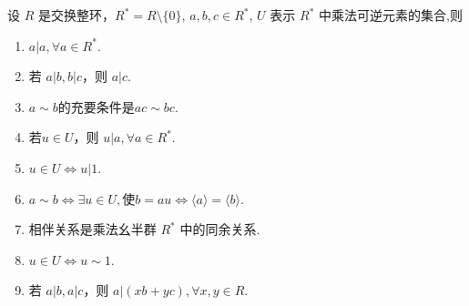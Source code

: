 \documentclass[../../main.tex]{subfiles}%
\begin{document}
\begin{theorem}\label{theorem:单位群整除的基本性质}
设 \( R \) 是交换整环，\( R^* = R \setminus \{0\} \), \( a, b,c \in R^* \), \( U \) 表示 \( R^* \) 中乘法可逆元素的集合,则
\begin{enumerate}[(1)]
\item\label{theorem:单位群整除的基本性质-1} \( a|a, \forall a \in R^* \).

\item 若 \( a|b, b|c \)，则 \( a|c \).

\item\label{theorem:单位群整除的基本性质-2} $a\sim b$的充要条件是$ac\sim bc.$

\item\label{theorem:单位群整除的基本性质-3} 若\( u \in U \)，则 \( u|a, \forall a \in R^* \). 

\item\label{theorem:单位群整除的基本性质-4} \( u \in U \iff u|1 \).

\item\label{theorem:单位群整除的基本性质-5} $a\sim b\Longleftrightarrow \exists u\in U,\text{使}b=au\Longleftrightarrow \langle a\rangle =\langle b\rangle .$

\item\label{theorem:单位群整除的基本性质-8} 相伴关系是乘法幺半群 \( R^* \) 中的同余关系.

\item\label{theorem:单位群整除的基本性质-7} \( u \in U \iff u \sim 1 \).

\item\label{theorem:单位群整除的基本性质-9} 若 \( a|b, a|c \)，则 \( a|(xb + yc) ,\forall x,y\in R\).
\end{enumerate}
\end{theorem}
\end{document}
